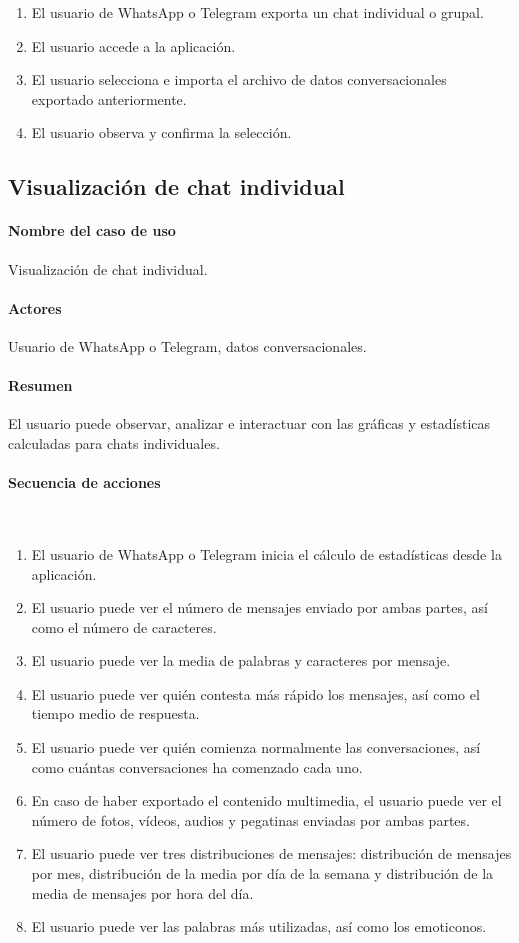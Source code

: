 \begin{enumerate}
	\item El usuario de WhatsApp o Telegram exporta un chat individual o grupal.
	\item El usuario accede a la aplicación.
	\item El usuario selecciona e importa el archivo de datos conversacionales exportado anteriormente.
	\item El usuario observa y confirma la selección.
\end{enumerate}

\subsection{Visualización de chat individual}

\paragraph{Nombre del caso de uso} Visualización de chat individual.
\paragraph{Actores} Usuario de WhatsApp o Telegram, datos conversacionales.
\paragraph{Resumen} El usuario puede observar, analizar e interactuar con las gráficas y estadísticas calculadas para chats individuales.
\paragraph{Secuencia de acciones}\mbox{}\\

\begin{enumerate}
	\item El usuario de WhatsApp o Telegram inicia el cálculo de estadísticas desde la aplicación.
	\item El usuario puede ver el número de mensajes enviado por ambas partes, así como el número de caracteres.
	\item El usuario puede ver la media de palabras y caracteres por mensaje.
	\item El usuario puede ver quién contesta más rápido los mensajes, así como el tiempo medio de respuesta.
	\item El usuario puede ver quién comienza normalmente las conversaciones, así como cuántas conversaciones ha comenzado cada uno.
	\item En caso de haber exportado el contenido multimedia, el usuario puede ver el número de fotos, vídeos, audios y pegatinas enviadas por ambas partes.
	\item El usuario puede ver tres distribuciones de mensajes: distribución de mensajes por mes, distribución de la media por día de la semana y distribución de la media de mensajes por hora del día.
	\item El usuario puede ver las palabras más utilizadas, así como los emoticonos.
\end{enumerate}

